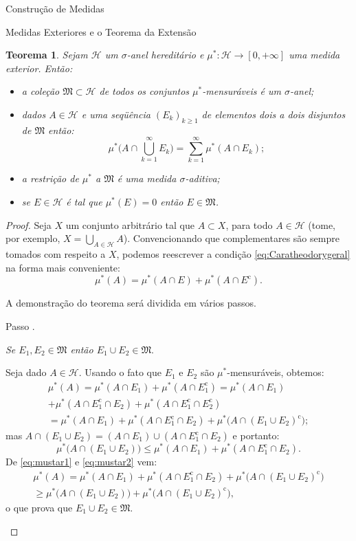 \documentclass[oneside,final,11pt]{amsbook}
\newcommand{\compl}{\mathrm c}
\newcounter{contastep}
\newenvironment{stepindent}{\setcounter{contastep}{1}
\begin{list} {Passo \arabic{contastep}.}
{\usecounter{contastep}
\setlength{\leftmargin}{10pt}
\setlength{\rightmargin}{10pt}
\setlength{\labelsep}{5pt}
\setlength{\itemsep}{10pt}
\setlength{\topsep}{10pt}}}
{\end{list}}
\theoremstyle{remark}\newtheorem{exercise}{Exercício}[chapter]
\theoremstyle{remark}\newtheorem{*exercise}[exercise]{\hbox to 0pt{\hskip 0pt minus 1fil*}Exercício}
\theoremstyle{definition}\newtheorem{exdefin}{Definição}[chapter]
\theoremstyle{plain}\newtheorem{teo}{Teorema}[section]
\theoremstyle{plain}\newtheorem{lem}[teo]{Lema}
\theoremstyle{plain}\newtheorem{prop}[teo]{Proposição}
\theoremstyle{plain}\newtheorem{cor}[teo]{Corolário}
\theoremstyle{definition}\newtheorem{defin}[teo]{Definição}
\theoremstyle{remark}\newtheorem{rem}[teo]{Observação}
\theoremstyle{definition}\newtheorem{notation}[teo]{Notação}
\theoremstyle{definition}\newtheorem{convention}[teo]{Convenção}
\theoremstyle{definition}\newtheorem{example}[teo]{Exemplo}
\numberwithin{section}{chapter}
\numberwithin{equation}{section}
\begin{document}
\begin{chapter}{Construção de Medidas}
\begin{section}{Medidas Exteriores e o Teorema da Extensão}
\begin{teo}\label{thm:teomustarmens}
Sejam $\mathcal H$ um $\sigma$-anel hereditário e $\mu^*:\mathcal H\to[0,+\infty]$
uma medida exterior. Então:
\begin{itemize}
\item[(a)] a coleção $\mathfrak M\subset\mathcal H$ de todos os conjuntos $\mu^*$-mensuráveis
é um $\sigma$-anel;
\item[(b)] dados $A\in\mathcal H$ e uma seqüência $(E_k)_{k\ge1}$ de elementos dois a dois
disjuntos de $\mathfrak M$ então:
\begin{equation}\label{eq:supersigmaadd}
\mu^*\Big(A\cap\bigcup_{k=1}^\infty E_k\Big)=\sum_{k=1}^\infty\mu^*(A\cap E_k);
\end{equation}
\item[(c)] a restrição de $\mu^*$ a $\mathfrak M$ é uma medida $\sigma$-aditiva;
\item[(d)] se $E\in\mathcal H$ é tal que $\mu^*(E)=0$ então $E\in\mathfrak M$.
\end{itemize}
\end{teo}
\begin{proof}
Seja $X$ um conjunto arbitrário tal que $A\subset X$, para todo $A\in\mathcal H$
(tome, por exemplo, $X=\bigcup_{A\in\mathcal H}A$). Convencionando que complementares
são sempre tomados com respeito a $X$, podemos reescrever a condição \eqref{eq:Caratheodorygeral}
na forma mais conveniente:
\[\mu^*(A)=\mu^*(A\cap E)+\mu^*(A\cap E^\compl).\]

A demonstração do teorema será dividida em vários passos.

\begin{stepindent}
\item\label{itm:mustaruniao1}
{\em Se $E_1,E_2\in\mathfrak M$ então $E_1\cup E_2\in\mathfrak M$}.

Seja dado $A\in\mathcal H$. Usando o fato que $E_1$ e $E_2$ são $\mu^*$-mensuráveis, obtemos:
\begin{multline}\label{eq:mustar1}
\mu^*(A)=\mu^*(A\cap E_1)+\mu^*(A\cap E_1^\compl)=\mu^*(A\cap E_1)\\
+\mu^*(A\cap E_1^\compl\cap E_2)+\mu^*(A\cap E_1^\compl\cap E_2^\compl)\\
=\mu^*(A\cap E_1)+\mu^*(A\cap E_1^\compl\cap E_2)+\mu^*\big(A\cap(E_1\cup E_2)^\compl\big);
\end{multline}
mas $A\cap(E_1\cup E_2)=(A\cap E_1)\cup(A\cap E_1^\compl\cap E_2)$ e portanto:
\begin{equation}\label{eq:mustar2}
\mu^*\big(A\cap(E_1\cup E_2)\big)\le\mu^*(A\cap E_1)+\mu^*(A\cap E_1^\compl\cap E_2).
\end{equation}
De \eqref{eq:mustar1} e \eqref{eq:mustar2} vem:
\begin{multline*}
\mu^*(A)=\mu^*(A\cap E_1)+\mu^*(A\cap E_1^\compl\cap E_2)+\mu^*\big(A\cap(E_1\cup E_2)^\compl\big)\\
\ge\mu^*\big(A\cap(E_1\cup E_2)\big)+\mu^*\big(A\cap(E_1\cup E_2)^\compl\big),
\end{multline*}
o que prova que $E_1\cup E_2\in\mathfrak M$.


\end{stepindent}
\end{proof}
\end{section}
\end{chapter}
\end{document}
